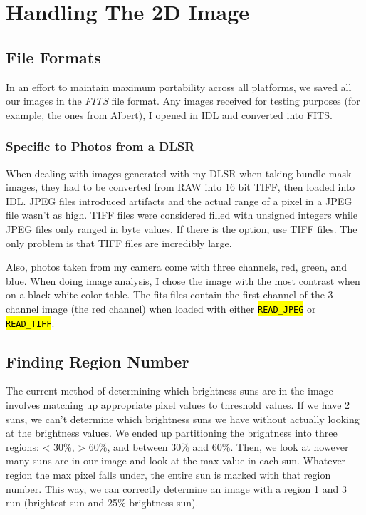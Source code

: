 \documentclass[10pt]{scrartcl}
\begin{document}

\section{Handling The 2D Image} %
\label{sec:handling_the_2d_image}

\subsection{File Formats} %
\label{sub:file_formats}
In an effort to maintain maximum portability across all platforms, we saved all our images in the \emph{FITS} file format. Any images received for testing purposes (for example, the ones from Albert), I opened in IDL and converted into FITS. 

\subsubsection{Specific to Photos from a DLSR} %
 \label{ssub:specific_to_photos_from_a_dlsr}
When dealing with images generated with my DLSR when taking bundle mask images, they had to be converted from RAW into 16 bit TIFF, then loaded into IDL. JPEG files introduced artifacts and the actual range of a pixel in a JPEG file wasn't as high. TIFF files were considered filled with unsigned integers while JPEG files only ranged in byte values. If there is the option, use TIFF files. The only problem is that TIFF files are incredibly large.  

Also, photos taken from my camera come with three channels, red, green, and blue. When doing image analysis, I chose the image with the most contrast when on a black-white color table. The fits files contain the first channel of the 3 channel image (the red channel) when loaded with either \hl{\texttt{READ\_JPEG}} or \hl{\texttt{READ\_TIFF}}.

\subsection{Finding Region Number} %
\label{sub:finding_region_number}
The current method of determining which brightness suns are in the image involves matching up appropriate pixel values to threshold values. If we have 2 suns, we can't determine which brightness suns we have without actually looking at the brightness values. We ended up partitioning the brightness into three regions: < 30\%, > 60\%, and between 30\% and 60\%. Then, we look at however many suns are in our image and look at the max value in each sun. Whatever region the max pixel falls under, the entire sun is marked with that region number. This way, we can correctly determine an image with a region 1 and 3 run (brightest sun and 25\% brightness sun). 
\end{document}
